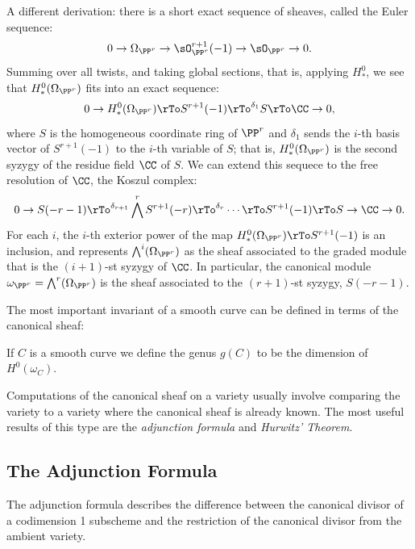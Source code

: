 \begin{fact}
A different derivation: there is a short exact sequence of sheaves, called the Euler sequence:
$$
0\to \Omega_{\PP^{r}} \to \sO_{\PP^{r}}^{r+1} (-1) \to \sO_{\PP^{r}} \to 0.
$$
Summing over all twists, and taking global sections, that is, applying $H^0_*$, we see that 
$H^0_*(\Omega_{\PP^{r}})$ fits into an exact sequence:
$$
0 \to H^0_*(\Omega_{\PP^{r}}) \rTo S^{r+1}(-1) \rTo^{\delta_{1}} S \rTo \CC \to 0,
$$
where $S$ is the homogeneous coordinate ring of $\PP^r$ and $\delta_1$ sends the $i$-th basis vector of
$S^{r+1}(-1)$ to the $i$-th variable of $S$; that is, $H^0_*(\Omega_{\PP^{r}})$ is the second syzygy of the residue field $\CC$ of $S$. We can extend this sequece to  the free resolution
of $\CC$, the Koszul complex:
$$
0 \to S(-r-1) \rTo^{\delta_{r+1}} \bigwedge^rS^{r+1}(-r) \rTo^{\delta_{r}} \cdots \rTo S^{r+1}(-1) \rTo S \to \CC \to 0.
$$
For each $i$, the $i$-th exterior power of the map $H^0_*(\Omega_{\PP^{r}}) \rTo S^{r+1}(-1)$ is an inclusion, and
represents $\bigwedge^i(\Omega_{\PP^{r}})$ as the sheaf associated to the graded module that is the $(i+1)$-st syzygy of $\CC$.
In particular, the canonical module $\omega_{\PP^r} = \bigwedge^r(\Omega_{\PP^{r}})$ is the sheaf associated to the 
$(r+1)$-st syzygy, $S(-r-1)$.
\end{fact}

The most important invariant of a smooth curve can be defined in terms of the canonical sheaf:

\begin{definition}
If $C$ is a smooth curve we define the genus $g(C)$ to be the dimension of $H^0(\omega_C)$.
\end{definition}

Computations of the canonical sheaf on a variety usually involve comparing the variety to a variety where the canonical sheaf is already known. The most useful results of this type are  the \emph{adjunction formula}
and \emph{Hurwitz' Theorem}. 

\subsection{The Adjunction Formula}\label{Adjunction Formula}

The adjunction formula describes the difference between the canonical divisor of
a codimension 1 subscheme and the restriction of the canonical divisor from the ambient variety.

